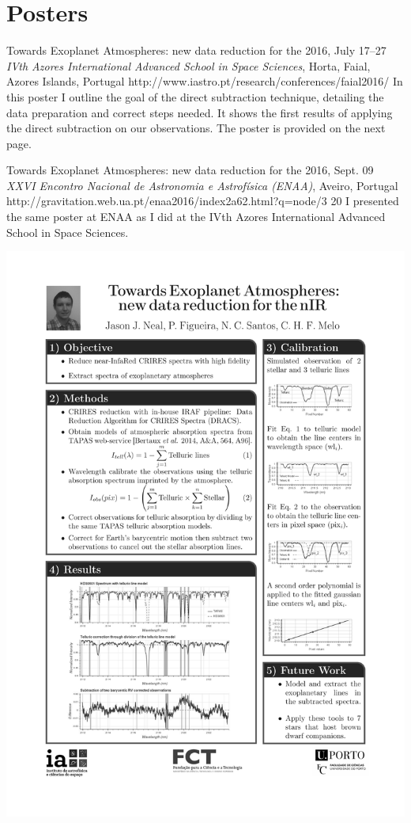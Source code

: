 \section{Posters}\label{app_sec:posters}

 {Towards Exoplanet Atmospheres: new data reduction for the \nir{}}%
{2016, July 17--27}%
{\textit{IVth Azores International Advanced School in Space Sciences}, Horta, Faial, Azores Islands, Portugal}%
{http://www.iastro.pt/research/conferences/faial2016/}%
{}%
{In this poster I outline the goal of the direct subtraction technique, detailing the data preparation and correct steps needed. It shows the first results of applying the direct subtraction on our observations. The poster is provided on the next page.}%


 {Towards Exoplanet Atmospheres: new data reduction for the \nir{}}%
{2016, Sept. 09}%
{\textit{XXVI Encontro Nacional de Astronomia e Astrofísica (ENAA)}, Aveiro, Portugal}%
{ http://gravitation.web.ua.pt/enaa2016/index2a62.html?q=node/3}%
{20}%
{I presented the same poster at ENAA as I did at the IVth Azores International Advanced School in Space Sciences.}


{\centering \includegraphics[width=1\textwidth, keepaspectratio=true, page = 1, trim = 1.5cm 1cm 1.5cm 1cm, clip = true]{appendices/papers/Azores2016_grey}}